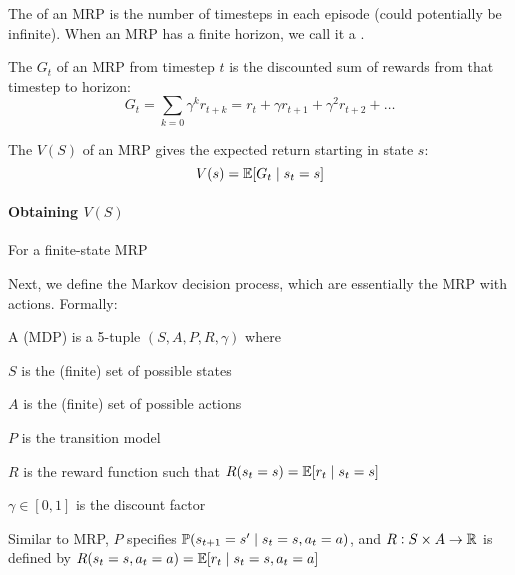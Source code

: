 \documentclass{styles/tufte}
\begin{document}
  \begin{definition}{}{}
    The  of an MRP is the number of timesteps in each episode (could potentially be infinite). When an MRP has a finite horizon, we call it a .
  \end{definition}
  
  \begin{definition}{}{}
    The  $G_t$ of an MRP from timestep $t$ is the discounted sum of rewards from that timestep to horizon:
    \[ G_t = \sum_{k=0} \gamma^k r_{t+k} = r_t + \gamma r_{t+1} + \gamma^2 r_{t+2} + \dots \]
  \end{definition}
  
  \begin{definition}{}{}
    The  $V(S)$ of an MRP gives the expected return starting in state $s$:
    \[ V(s) = \operatorname{\mathbb{E}}[G_t \mid s_t = s] \]
  \end{definition}
  
  \paragraph{Obtaining $V(S)$} For a finite-state MRP
  
  Next, we define the Markov decision process, which are essentially the MRP with actions. Formally:
  
  \begin{definition}{}{}
    A  (MDP) is a 5-tuple $(S, A, P, R, \gamma)$ where
    \begin{romanenum}
      \item $S$ is the (finite) set of possible states
      \item $A$ is the (finite) set of possible actions
      \item $P$ is the transition model
      \item $R$ is the reward function such that $R(s_t = s) = \operatorname{\mathbb{E}}[r_t \mid s_t = s]$
      \item $\gamma \in [0, 1]$ is the discount factor
    \end{romanenum}
  \end{definition}
  
  Similar to MRP, $P$ specifies $\operatorname{\mathbb{P}}(s_{t+1} = s' \mid s_t = s, a_t = a)$, and $R : S \times A \to \mathbb{R}$ is defined by $R(s_t = s, a_t = a) = \operatorname{\mathbb{E}}[r_t \mid s_t = s, a_t = a]$
\end{document}
